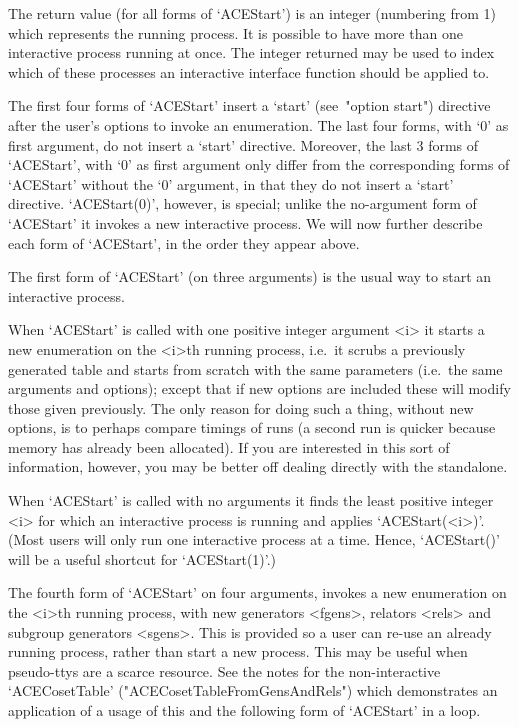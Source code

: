 The  return  value  (for  all  forms  of  `ACEStart')  is  an  integer
(numbering from  1)  which  represents  the  running  process.  It  is
possible to have more than one interactive process  running  at  once.
The integer returned may be used to index which of these processes  an
interactive {\ACE} interface function should be applied to.

The first four forms  of  `ACEStart'  insert  a  `start'  (see~"option
start") directive after the user's options to invoke  an  enumeration.
The last four forms, with `0' as  first  argument,  do  not  insert  a
`start' directive. Moreover, the last 3 forms of `ACEStart', with  `0'
as  first  argument  only  differ  from  the  corresponding  forms  of
`ACEStart' without the `0' argument, in that  they  do  not  insert  a
`start' directive. `ACEStart(0)',  however,  is  special;  unlike  the
no-argument form of `ACEStart' it invokes  a  new  interactive  {\ACE}
process. We will now further describe each form of `ACEStart', in  the
order they appear above.

The first form of `ACEStart' (on three arguments) is the usual way  to
start an interactive {\ACE} process.

When `ACEStart' is called with one positive integer  argument  <i>  it
starts a new enumeration on the <i>th running process, i.e.~it  scrubs
a previously generated table and starts from  scratch  with  the  same
parameters (i.e.~the same arguments and options); except that  if  new
options are included these will modify  those  given  previously.  The
only reason for doing such a thing, without new options, is to perhaps
compare timings of runs (a second run is quicker  because  memory  has
already been allocated).  If  you  are  interested  in  this  sort  of
information, however, you may be better off dealing directly with  the
standalone.

When `ACEStart' is  called  with  no  arguments  it  finds  the  least
positive integer <i> for which an interactive process is  running  and
applies `ACEStart(<i>)'. (Most users will  only  run  one  interactive
process at a time. Hence, `ACEStart()' will be a useful  shortcut  for
`ACEStart(1)'.)

The fourth form  of  `ACEStart'  on  four  arguments,  invokes  a  new
enumeration on the <i>th running process, with new generators <fgens>,
relators <rels> and subgroup generators <sgens>. This is provided so a
user can re-use an already running process, rather than  start  a  new
process. This may be useful when pseudo-ttys are  a  scarce  resource.
See   the    notes    for    the    non-interactive    `ACECosetTable'
("ACECosetTableFromGensAndRels") which demonstrates an application  of
a usage of this and the following form of `ACEStart' in a loop.

